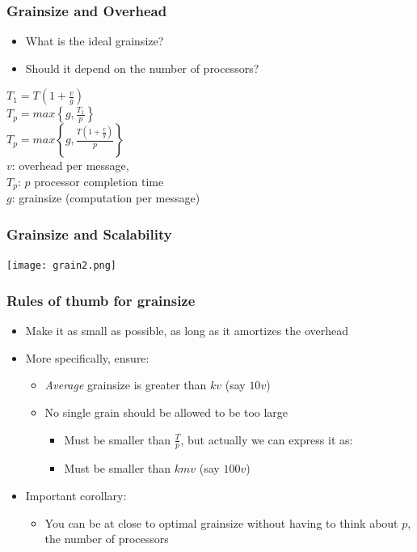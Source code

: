 \documentclass{beamer}
\begin{document}
\begin{frame}
  \frametitle{Grainsize and Overhead}
  \begin{itemize}
    \item What is the ideal grainsize?
    \item Should it depend on the number of processors?
    
  \end{itemize}
  \begin{center}
    $T_1 = T \left( 1 + \frac{v}{g} \right)$\\
    $T_p = max \left\{ g, \frac{T_1}{p} \right\}$\\
    $T_p = max \left\{ g, \frac{T\left( 1+ \frac{v}{g} \right)}{p} \right\}$\\
    $v$: overhead per message,\\
    $T_p$: $p$ processor completion time\\
    $g$: grainsize (computation per message)
  \end{center}
\end{frame}

\begin{frame}
  \frametitle{Grainsize and Scalability}
  \begin{center} \texttt{[image: grain2.png]} \end{center}
\end{frame}

\begin{frame}
  \frametitle{Rules of thumb for grainsize}
  \begin{itemize}
    \item Make it as small as possible, as long as it amortizes the overhead
    \item More specifically, ensure:
      \begin{itemize}
      \item \textit{Average} grainsize is greater than $kv$ (say $10v$)
      \item No single grain should be allowed to be too large 
        \begin{itemize}
          \item Must be smaller than $\frac{T}{p}$, but actually we can express
            it as:
          \item Must be smaller than $kmv$ (say $100v$)
        \end{itemize}
      \end{itemize}
    \item Important corollary:
      \begin{itemize}
      \item You can be at close to optimal grainsize without having to think
        about $p$, the number of processors
      \end{itemize}
  \end{itemize}
\end{frame}
\end{document}
